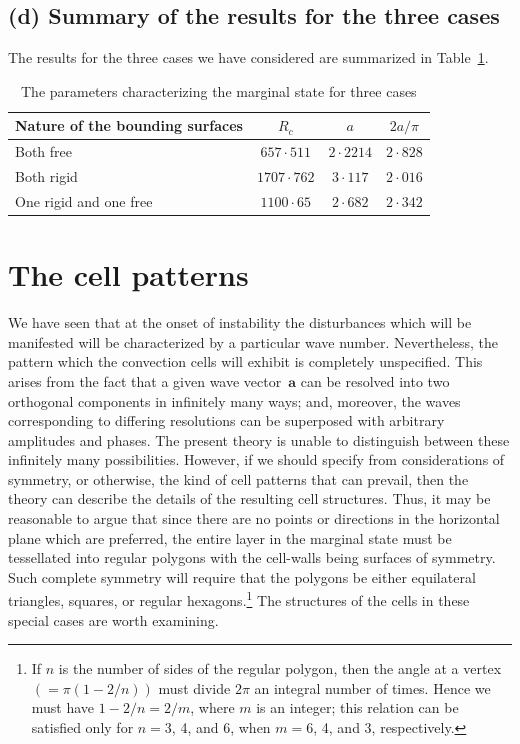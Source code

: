 \subsection*{(d) Summary of the results for the three cases}

The results for the three cases we have considered are summarized in
Table~\ref{tab:2-III}.

\begin{table}[htbp]
\centering
\caption{The parameters characterizing the marginal state for three cases}
\label{tab:2-III}
\medskip
\begin{tabular}{@{}l ccc@{}}
\toprule
Nature of the bounding surfaces & $R_c$ & $a$ & $2a/\pi$ \\
\midrule
Both free        & $657{\cdot}511$  & $2{\cdot}2214$ & $2{\cdot}828$ \\
Both rigid       & $1707{\cdot}762$ & $3{\cdot}117$  & $2{\cdot}016$ \\
One rigid and one free & $1100{\cdot}65$  & $2{\cdot}682$  & $2{\cdot}342$ \\
\bottomrule
\end{tabular}
\end{table}

\section{The cell patterns}\label{sec:16}

We have seen that at the onset of instability the disturbances which
will be manifested will be characterized by a particular wave number.
Nevertheless, the pattern which the convection cells will exhibit is
completely unspecified. This arises from the fact that a given wave
vector~$\mathbf{a}$ can be resolved into two orthogonal components in infinitely
many ways; and, moreover, the waves corresponding to differing resolutions
can be superposed with arbitrary amplitudes and phases. The
present theory is unable to distinguish between these infinitely many
possibilities. However, if we should specify from considerations of
symmetry, or otherwise, the kind of cell patterns that can prevail, then
the theory can describe the details of the resulting cell structures. Thus,
it may be reasonable to argue that since there are no points or directions
in the horizontal plane which are preferred, the entire layer in the
marginal state must be tessellated into regular polygons with the cell-walls
being surfaces of symmetry. Such complete symmetry will
require that the polygons be either equilateral triangles, squares, or
regular hexagons.\footnote{If $n$ is the number of sides of the regular polygon, then the angle at a vertex
$(= \pi(1-2/n))$ must divide $2\pi$ an integral number of times. Hence we must have
$1 - 2/n = 2/m$, where $m$ is an integer; this relation can be satisfied only for $n = 3$, 4,
and 6, when $m = 6$, 4, and 3, respectively.} The structures of the cells in these special cases
are worth examining.

